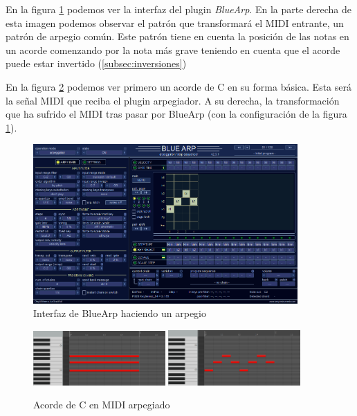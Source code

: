 En la figura \ref{fig:BlueArp} podemos ver la interfaz del plugin \textit{BlueArp}. En la parte derecha de esta imagen podemos observar el patrón que transformará el MIDI entrante, un patrón de arpegio común. Este patrón tiene en cuenta la posición de las notas en un acorde comenzando por la nota más grave teniendo en cuenta que el acorde puede estar invertido (\ref{subsec:inversiones})

En la figura \ref{fig:CArpegiadoenMIDI} podemos ver primero un acorde de C en su forma básica. Esta será la señal MIDI que reciba el plugin arpegiador. A su derecha, la transformación que ha sufrido el MIDI tras pasar por BlueArp (con la configuración de la figura \ref{fig:BlueArp}). 

\begin{figure}[h]
    \centering
    \includegraphics[width = 0.9\textwidth]{Imagenes/Bitmap/BlueArp.png}
    \caption{Interfaz de BlueArp haciendo un arpegio}
    \label{fig:BlueArp}
\end{figure}
    
\begin{figure}[h]
    \centering
    \includegraphics[width = 0.45\textwidth]{Imagenes/Bitmap/DoMayorMidi.png}
    \includegraphics[width = 0.45\textwidth]{Imagenes/Bitmap/DoMayorMidiArpegiado.png}
    \caption{Acorde de C en MIDI arpegiado}
    \label{fig:CArpegiadoenMIDI}
\end{figure}

